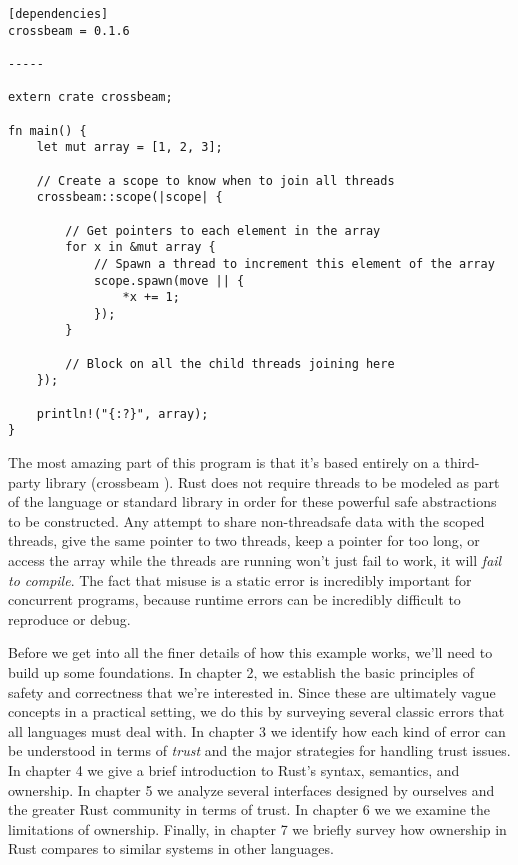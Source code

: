 \begin{verbatim}
[dependencies]
crossbeam = 0.1.6

-----

extern crate crossbeam;

fn main() {
    let mut array = [1, 2, 3];

    // Create a scope to know when to join all threads
    crossbeam::scope(|scope| {

        // Get pointers to each element in the array
        for x in &mut array {
            // Spawn a thread to increment this element of the array
            scope.spawn(move || {
                *x += 1;
            });
        }

        // Block on all the child threads joining here
    });

    println!("{:?}", array);
}
\end{verbatim}

The most amazing part of this program is that it's based entirely on a third-
party library (crossbeam \cite{crossbeam}). Rust does not require threads to be modeled as part
of the language or standard library in order for these powerful safe
abstractions to be constructed. Any attempt to share non-threadsafe data with
the scoped threads, give the same pointer to two threads, keep a pointer for too
long, or access the array while the threads are running won't just fail to work,
it will \emph{fail to compile}. The fact that misuse is a static error is incredibly
important for concurrent programs, because runtime errors can be incredibly
difficult to reproduce or debug.

Before we get into all the finer details of how this example works, we'll need
to build up some foundations. In chapter 2, we establish
the basic principles of safety and correctness that we're interested in. Since
these are ultimately vague concepts in a practical setting, we do this by
surveying several classic errors that all languages must deal with. In chapter 3
we identify how each kind of error can be understood in terms of
\emph{trust} and the major strategies for handling trust issues. In chapter 4
we give a brief introduction to Rust's syntax, semantics, and ownership. In
chapter 5 we analyze several interfaces designed by ourselves and the greater
Rust community in terms of trust. In chapter 6 we we examine the limitations of
ownership. Finally, in chapter 7 we briefly survey how ownership in Rust compares
to similar systems in other languages.

